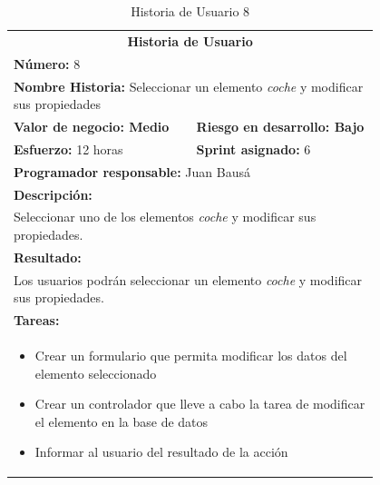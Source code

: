 	\begin{table}[H]
	  \centering 
	 	\begin{tabular}{p{0.4\linewidth}p{0.4\linewidth}}
	    \toprule
	    \multicolumn{2}{c}{\cellcolor{black!30}\textbf{Historia de Usuario}} 													\\
		\multicolumn{2}{l}{\cellcolor{gray!25}\textbf{Número: }8}																\\
		\multicolumn{2}{l}{\textbf{Nombre Historia: } Seleccionar un elemento \textit{coche} y modificar sus propiedades}							\\
		\cellcolor{gray!25}\textbf{Valor de negocio: Medio}	&	\cellcolor{gray!25}\textbf{Riesgo en desarrollo: Bajo}		\\
		\textbf{Esfuerzo:} 12 horas				&	\textbf{Sprint asignado: }6 												\\
		\multicolumn{2}{l}{\cellcolor{gray!25}\textbf{Programador responsable: }Juan Bausá}									\\
		\multicolumn{2}{l}{\textbf{Descripción:}}                                                     						\\
		\multicolumn{2}{l}{\parbox{15cm}{Seleccionar uno de los elementos \textit{coche} y modificar sus propiedades.}}				\\
		\multicolumn{2}{l}{\cellcolor{gray!25}\textbf{Resultado:}}																\\		
		\multicolumn{2}{l}{\parbox{15cm}{Los usuarios podrán seleccionar un elemento \textit{coche} y modificar sus propiedades.}}																								\\
		\multicolumn{2}{l}{\textbf{Tareas:}}																					\\
		\multicolumn{2}{l}{
			\begin{minipage}{12cm}
	    		\vskip 4pt
	    		\begin{itemize}
	    			\item Crear un formulario que permita modificar los datos del elemento seleccionado
	    			\item Crear un controlador que lleve a cabo la tarea de modificar el elemento en la base de datos
	    			\item Informar al usuario del resultado de la acción
				\end{itemize}
			  	\vskip 4pt
		 	\end{minipage}
		} \\																				
	    \hline
	  \end{tabular}
	  \caption{Historia de Usuario 8}
	\end{table}
	

